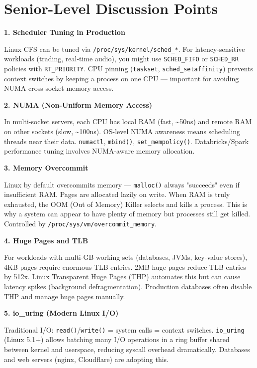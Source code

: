 \documentclass[11pt]{article}
\begin{document}
\section{Senior-Level Discussion Points}\label{senior-level-discussion-points}

\textbf{1. Scheduler Tuning in Production}

Linux CFS can be tuned via \texttt{/proc/sys/kernel/sched\_*}. For latency-sensitive workloads (trading, real-time audio), you might use \texttt{SCHED\_FIFO} or \texttt{SCHED\_RR} policies with \texttt{RT\_PRIORITY}. CPU pinning (\texttt{taskset}, \texttt{sched\_setaffinity}) prevents context switches by keeping a process on one CPU --- important for avoiding NUMA cross-socket memory access.

\textbf{2. NUMA (Non-Uniform Memory Access)}

In multi-socket servers, each CPU has local RAM (fast, \textasciitilde50ns) and remote RAM on other sockets (slow, \textasciitilde100ns). OS-level NUMA awareness means scheduling threads near their data. \texttt{numactl}, \texttt{mbind()}, \texttt{set\_mempolicy()}. Databricks/Spark performance tuning involves NUMA-aware memory allocation.

\textbf{3. Memory Overcommit}

Linux by default overcommits memory --- \texttt{malloc()} always "succeeds" even if insufficient RAM. Pages are allocated lazily on write. When RAM is truly exhausted, the OOM (Out of Memory) Killer selects and kills a process. This is why a system can appear to have plenty of memory but processes still get killed. Controlled by \texttt{/proc/sys/vm/overcommit\_memory}.

\textbf{4. Huge Pages and TLB}

For workloads with multi-GB working sets (databases, JVMs, key-value stores), 4KB pages require enormous TLB entries. 2MB huge pages reduce TLB entries by 512x. Linux Transparent Huge Pages (THP) automates this but can cause latency spikes (background defragmentation). Production databases often disable THP and manage huge pages manually.

\textbf{5. io\_uring (Modern Linux I/O)}

Traditional I/O: \texttt{read()}/\texttt{write()} = system calls = context switches. \texttt{io\_uring} (Linux 5.1+) allows batching many I/O operations in a ring buffer shared between kernel and userspace, reducing syscall overhead dramatically. Databases and web servers (nginx, Cloudflare) are adopting this.
\end{document}
